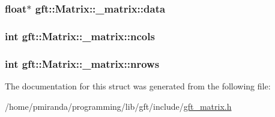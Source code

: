 \subsubsection[{\texorpdfstring{data}{data}}]{\setlength{\rightskip}{0pt plus 5cm}float$\ast$ gft\+::\+Matrix\+::\+\_\+matrix\+::data}\hypertarget{structgft_1_1Matrix_1_1__matrix_af255bafdb1d32fb340b7b0f41bc720f7}{}\label{structgft_1_1Matrix_1_1__matrix_af255bafdb1d32fb340b7b0f41bc720f7}
\subsubsection[{\texorpdfstring{ncols}{ncols}}]{\setlength{\rightskip}{0pt plus 5cm}int gft\+::\+Matrix\+::\+\_\+matrix\+::ncols}\hypertarget{structgft_1_1Matrix_1_1__matrix_a4b61985e3d0ec2950798d37bfcec916a}{}\label{structgft_1_1Matrix_1_1__matrix_a4b61985e3d0ec2950798d37bfcec916a}
\subsubsection[{\texorpdfstring{nrows}{nrows}}]{\setlength{\rightskip}{0pt plus 5cm}int gft\+::\+Matrix\+::\+\_\+matrix\+::nrows}\hypertarget{structgft_1_1Matrix_1_1__matrix_a0c4817339b3dd2b842cb2fd66df70bcc}{}\label{structgft_1_1Matrix_1_1__matrix_a0c4817339b3dd2b842cb2fd66df70bcc}


The documentation for this struct was generated from the following file\+:\begin{DoxyCompactItemize}
\item 
/home/pmiranda/programming/lib/gft/include/\hyperlink{gft__matrix_8h}{gft\+\_\+matrix.\+h}\end{DoxyCompactItemize}
